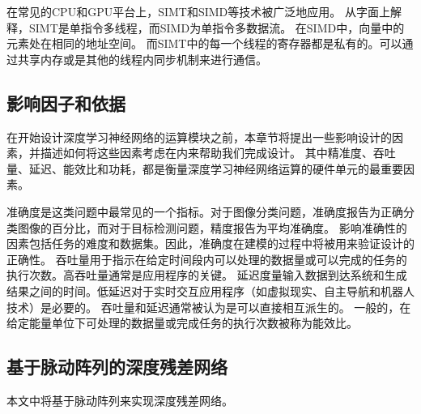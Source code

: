 在常见的CPU和GPU平台上，SIMT和SIMD等技术被广泛地应用。
从字面上解释，SIMT是单指令多线程，而SIMD为单指令多数据流。
在SIMD中，向量中的元素处在相同的地址空间。
而SIMT中的每一个线程的寄存器都是私有的。可以通过共享内存或是其他的线程内同步机制来进行通信。

\subsection{影响因子和依据}
在开始设计深度学习神经网络的运算模块之前，本章节将提出一些影响设计的因素，并描述如何将这些因素考虑在内来帮助我们完成设计。
其中精准度、吞吐量、延迟、能效比和功耗，都是衡量深度学习神经网络运算的硬件单元的最重要因素。


准确度是这类问题中最常见的一个指标。对于图像分类问题，准确度报告为正确分类图像的百分比，而对于目标检测问题，精度报告为平均准确度。
影响准确性的因素包括任务的难度和数据集。因此，准确度在建模的过程中将被用来验证设计的正确性。
吞吐量用于指示在给定时间段内可以处理的数据量或可以完成的任务的执行次数。高吞吐量通常是应用程序的关键。
延迟度量输入数据到达系统和生成结果之间的时间。低延迟对于实时交互应用程序（如虚拟现实、自主导航和机器人技术）是必要的。
吞吐量和延迟通常被认为是可以直接相互派生的。
一般的，在给定能量单位下可处理的数据量或完成任务的执行次数被称为能效比。


\subsection{基于脉动阵列的深度残差网络}
本文中将基于脉动阵列来实现深度残差网络。










